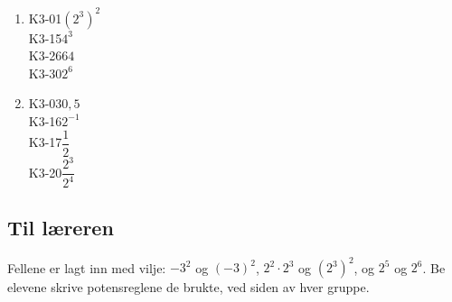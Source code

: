 \documentclass[11pt,a4paper]{article}
\begin{document}
\begin{enumerate}[leftmargin=1.6em, itemsep=0.7em]
\item \begin{minipage}[t]{\linewidth}\textsf{\small K3-01}\quad $(2^3)^2$ \\ \textsf{\small K3-15}\quad $4^3$ \\ \textsf{\small K3-26}\quad $64$ \\ \textsf{\small K3-30}\quad $2^6$\end{minipage}
\item \begin{minipage}[t]{\linewidth}\textsf{\small K3-03}\quad $0{,}5$ \\ \textsf{\small K3-16}\quad $2^{-1}$ \\ \textsf{\small K3-17}\quad $\dfrac{1}{2}$ \\ \textsf{\small K3-20}\quad $\dfrac{2^3}{2^4}$\end{minipage}
\end{enumerate}
\subsection*{Til læreren}
Fellene er lagt inn med vilje: $-3^2$ og $(-3)^2$, $2^2 \cdot 2^3$ og $(2^3)^2$, og $2^5$ og $2^6$. Be elevene skrive potensreglene de brukte, ved siden av hver gruppe.
\end{document}
